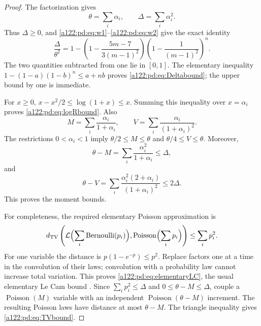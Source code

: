 \documentclass[11pt,letterpaper]{article}
\numberwithin{equation}{subsection}
\theoremstyle{definition}
\theoremstyle{remark}
\theoremstyle{plain}
\newcommand{\Poi}{\operatorname{Poisson}}
\newcommand{\Ber}{\operatorname{Bernoulli}}
\newcommand{\TV}{d_{\mathrm{TV}}}
\begin{document}
\begin{proof}
The factorization gives
\begin{equation}\label{a122:pd:eq:powersums}
 \theta=\sum_i\alpha_i,\qquad
 \Delta=\sum_i\alpha_i^2.
\end{equation}
Thus $\Delta\ge0$, and
\eqref{a122:pd:eq:w1}--\eqref{a122:pd:eq:w2} give the exact identity
\begin{equation}\label{a122:pd:eq:Deltaratio}
 \frac{\Delta}{\theta^2}
 =1-\left(1-\frac{5m-7}{3(m-1)^2}\right)
       \left(1-\frac1{(m-1)^2}\right)^n.
\end{equation}
The two quantities subtracted from one lie in $[0,1]$.
The elementary inequality $1-(1-a)(1-b)^n\le a+nb$ proves
\eqref{a122:pd:eq:Deltabound}; the upper bound by one is immediate.

For $x\ge0$, $x-x^2/2\le\log(1+x)\le x$.
Summing this inequality over $x=\alpha_i$ proves
\eqref{a122:pd:eq:logRbound}. Also
\[
 M=\sum_i\frac{\alpha_i}{1+\alpha_i},\qquad
 V=\sum_i\frac{\alpha_i}{(1+\alpha_i)^2}.
\]
The restrictions $0<\alpha_i<1$ imply $\theta/2\le M\le\theta$
and $\theta/4\le V\le\theta$.
Moreover,
\[
 \theta-M=\sum_i\frac{\alpha_i^2}{1+\alpha_i}\le\Delta,
\]
and
\[
 \theta-V=\sum_i
 \frac{\alpha_i^2(2+\alpha_i)}{(1+\alpha_i)^2}\le2\Delta.
\]
This proves the moment bounds.

For completeness, the required elementary Poisson approximation is
\begin{equation}\label{a122:pd:eq:elementaryLC}
 \TV\left(\mathcal L\Bigl(\sum_i\Ber(p_i)\Bigr),
                  \Poi\Bigl(\sum_i p_i\Bigr)\right)
 \le\sum_i p_i^2.
\end{equation}
For one variable the distance is
$p(1-e^{-p})\le p^2$. Replace factors one at a time in the convolution
of their laws; convolution with a probability law cannot increase total
variation. This proves \eqref{a122:pd:eq:elementaryLC}, the usual elementary
Le Cam bound \cite{a122:pd:lecam}. Since $\sum_i p_i^2\le\Delta$ and
$0\le\theta-M\le\Delta$, couple a $\Poi(M)$ variable with an
independent $\Poi(\theta-M)$ increment. The resulting Poisson laws have
distance at most $\theta-M$. The triangle inequality gives
\eqref{a122:pd:eq:TVbound}.
\end{proof}
\end{document}
